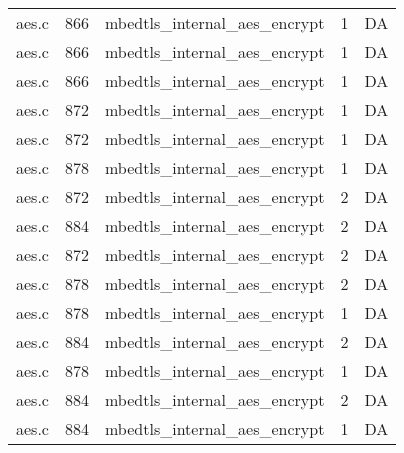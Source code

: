 \begin{table*}
\begin{tabular}{clrrr}
aes.c&866&mbedtls\_internal\_aes\_encrypt&1 &DA\\
aes.c&866&mbedtls\_internal\_aes\_encrypt&1 &DA\\
aes.c&866&mbedtls\_internal\_aes\_encrypt&1 &DA\\
aes.c&872&mbedtls\_internal\_aes\_encrypt&1 &DA\\
aes.c&872&mbedtls\_internal\_aes\_encrypt&1 &DA\\
aes.c&878&mbedtls\_internal\_aes\_encrypt&1 &DA\\
aes.c&872&mbedtls\_internal\_aes\_encrypt&2 &DA\\
aes.c&884&mbedtls\_internal\_aes\_encrypt&2 &DA\\
aes.c&872&mbedtls\_internal\_aes\_encrypt&2 &DA\\
aes.c&878&mbedtls\_internal\_aes\_encrypt&2 &DA\\
aes.c&878&mbedtls\_internal\_aes\_encrypt&1 &DA\\
aes.c&884&mbedtls\_internal\_aes\_encrypt&2 &DA\\
aes.c&878&mbedtls\_internal\_aes\_encrypt&1 &DA\\
aes.c&884&mbedtls\_internal\_aes\_encrypt&2 &DA\\
aes.c&884&mbedtls\_internal\_aes\_encrypt&1 &DA\\
\hline
\end{tabular}
\end{table*}